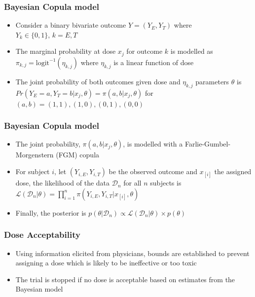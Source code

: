 \documentclass{beamer}
\begin{document}
	\begin{frame}
		\frametitle{Bayesian Copula model} 
		\begin{itemize}
			\setlength\itemsep{2em}
			\item Consider a binary bivariate outcome $Y=(Y_E,Y_T)$ where $Y_k \in \{0,1\},\,k=E,T$ 
			\item The marginal probability at dose $x_j$ for outcome $k$ is modelled as
			$\pi_{k,j}=\text{logit}^{-1}(\eta_{k,j})$ where $\eta_{k,j}$ is a linear function of dose
			\item The joint probability of both outcomes given dose and $\eta_{k,j}$ parameters $\theta$ is $Pr(Y_E=a,Y_T=b|x_j,\theta)=\pi(a,b|x_j,\theta)$ for $(a,b)=(1,1),(1,0),(0,1),(0,0)$

		\end{itemize}
	\end{frame}
	
	\begin{frame}
		\frametitle{Bayesian Copula model} 
		\begin{itemize}
			\setlength\itemsep{2em}
			\item The joint probability, $\pi(a,b|x_j,\theta)$, is modelled with a Farlie-Gumbel-Morgenstern (FGM) copula
			\item For subject $i$, let $(Y_{i,E},Y_{i,T})$ be the observed outcome and $x_{[i]}$ the assigned dose, the likelihood of the data $\mathcal{D}_n$ for all $n$ subjects is
			$\mathcal{L}(\mathcal{D}_n|\theta)=\prod_{i=1}^{n}\pi(Y_{i,E},Y_{i,T}|x_{[i]},\theta)$
			\item Finally, the posterior is $p(\theta|\mathcal{D}_n) \propto \mathcal{L}(\mathcal{D}_n|\theta) \times p(\theta)$
		\end{itemize}
	\end{frame}	
	
	\begin{frame}
		\frametitle{Dose Acceptability} 
		\begin{itemize}
			\setlength\itemsep{2em}
			\item Using information elicited from physicians, bounds are established to prevent assigning a dose which is likely to be ineffective or too toxic
			\item The trial is stopped if no dose is acceptable based on estimates from the Bayesian model 
		\end{itemize}
	\end{frame}
	
\end{document}

